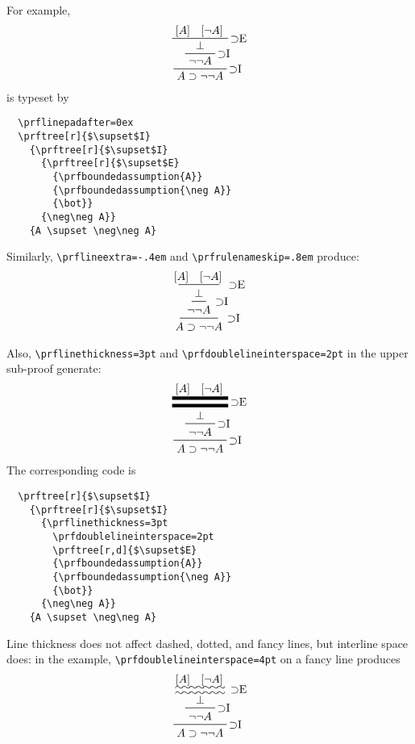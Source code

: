 \documentclass{amsart}
\begin{document}
For example, 
\begin{displaymath}
  \prflinepadafter=0ex
  \prftree[r]{$\supset$I}
  {\prftree[r]{$\supset$I}
    {\prftree[r]{$\supset$E}
      {\prfboundedassumption{A}}
      {\prfboundedassumption{\neg A}}
      {\bot}}
    {\neg\neg A}}
  {A \supset \neg\neg A}
\end{displaymath}
is typeset by
\begin{verbatim}
  \prflinepadafter=0ex
  \prftree[r]{$\supset$I}
    {\prftree[r]{$\supset$I}
      {\prftree[r]{$\supset$E}
        {\prfboundedassumption{A}}
        {\prfboundedassumption{\neg A}}
        {\bot}}
      {\neg\neg A}}
    {A \supset \neg\neg A}
\end{verbatim}

Similarly, \verb|\prflineextra=-.4em| and \verb|\prfrulenameskip=.8em|
produce: 
\begin{displaymath}
  {\prflineextra=-.4em
    \prfrulenameskip=.8em
  \prftree[r]{$\supset$I}
    {\prftree[r]{$\supset$I}
      {\prftree[r]{$\supset$E}
        {\prfboundedassumption{A}}
        {\prfboundedassumption{\neg A}}
        {\bot}}
      {\neg\neg A}}
    {A \supset \neg\neg A}}
\end{displaymath}

Also, \verb|\prflinethickness=3pt| and
\verb|\prfdoublelineinterspace=2pt| in the upper sub-proof generate:
\begin{displaymath}
  \prftree[r]{$\supset$I}
    {\prftree[r]{$\supset$I}
      {\prflinethickness=3pt
        \prfdoublelineinterspace=2pt
        \prftree[r,d]{$\supset$E}
        {\prfboundedassumption{A}}
        {\prfboundedassumption{\neg A}}
        {\bot}}
      {\neg\neg A}}
    {A \supset \neg\neg A}
\end{displaymath}
The corresponding code is
\begin{verbatim}
  \prftree[r]{$\supset$I}
    {\prftree[r]{$\supset$I}
      {\prflinethickness=3pt
        \prfdoublelineinterspace=2pt
        \prftree[r,d]{$\supset$E}
        {\prfboundedassumption{A}}
        {\prfboundedassumption{\neg A}}
        {\bot}}
      {\neg\neg A}}
    {A \supset \neg\neg A}
\end{verbatim}

Line thickness does not affect dashed, dotted, and fancy lines, but
interline space does: in the example,
\verb|\prfdoublelineinterspace=4pt| on a fancy line produces
\begin{displaymath}
  \prftree[r]{$\supset$I}
    {\prftree[r]{$\supset$I}
      {\prfdoublelineinterspace=4pt
        \prftree[r,d,f]{$\supset$E}
        {\prfboundedassumption{A}}
        {\prfboundedassumption{\neg A}}
        {\bot}}
      {\neg\neg A}}
    {A \supset \neg\neg A}
\end{displaymath}\vspace{.2ex}
\end{document}
